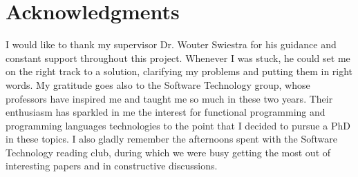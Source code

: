 \documentclass[12pt,a4paper]{report}
\begin{document}


%
%
%
%
%
%
%




\tableofcontents

	



 
\graphicspath{{Implementation/}}





\newpage

\section*{Acknowledgments}
I would like to thank my supervisor Dr. Wouter Swiestra for his guidance
and constant support throughout this project. 
Whenever I was stuck, he could set me on the right track to a solution,
clarifying my problems and putting them in right words.
My gratitude goes also to the Software Technology group, whose
professors have inspired me and taught me so much in these two years.
Their enthusiasm has sparkled in me the interest for functional programming and programming languages technologies to the point that I decided
to pursue a PhD in these topics.
I also gladly remember the afternoons spent with the Software Technology reading club, during which we were busy getting the most out of interesting papers and in constructive discussions.
\end{document}
